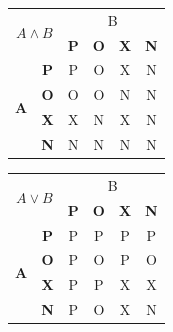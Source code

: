 \documentclass[a4paper,11pt]{article}
\begin{document}
\begin{center}
\begin{table}[ht]
\begin{minipage}[t]{0.25\textwidth}
\begin{tabular}{|c|c|c|c|c|c|}
                    \hline
                    \multicolumn{2}{|c|}{\multirow{2}{*}{$A \land B$}} & \multicolumn{4}{c|}{B} \\ 
                    \cline{3-6}
                    \multicolumn{2}{|c|}{} & \textbf{P} & \textbf{O} & \textbf{X} & \textbf{N} \\ 
                    \hline
                    \multirow{4}{*}{\textbf{A}} & \textbf{P} & P & O & X & N \\ 
                    \cline{2-6}
                    & \textbf{O} & O & O & N & N \\ 
                    \cline{2-6}
                    & \textbf{X} & X & N & X & N \\ 
                    \cline{2-6}
                    & \textbf{N} & N & N & N & N \\ 
                    \hline
                \end{tabular}
                \label{tab:implikace}
            \end{minipage}
            \hspace{0mm}
            \begin{minipage}[t]{0.25\textwidth}
                \centering
                \begin{tabular}{|c|c|c|c|c|c|}
                    \hline
                    \multicolumn{2}{|c|}{\multirow{2}{*}{$A \lor B$}} & \multicolumn{4}{c|}{B} \\ 
                    \cline{3-6}
                    \multicolumn{2}{|c|}{} & \textbf{P} & \textbf{O} & \textbf{X} & \textbf{N} \\ 
                    \hline
                    \multirow{4}{*}{\textbf{A}} & \textbf{P} & P & P & P & P \\ 
                    \cline{2-6}
                    & \textbf{O} & P & O & P & O \\ 
                    \cline{2-6}
                    & \textbf{X} & P & P & X & X \\ 
                    \cline{2-6}
                    & \textbf{N} & P & O & X & N \\ 
                    \hline
                \end{tabular}
                \label{tab:implikace}
            \end{minipage}
            \hspace{0mm}
            \begin{minipage}[t]{0.25\textwidth}
                \centering
                \begin{tabular}{|c|c|c|c|c|c|}

\end{tabular}
\end{minipage}
\end{table}
\end{center}
\end{document}
